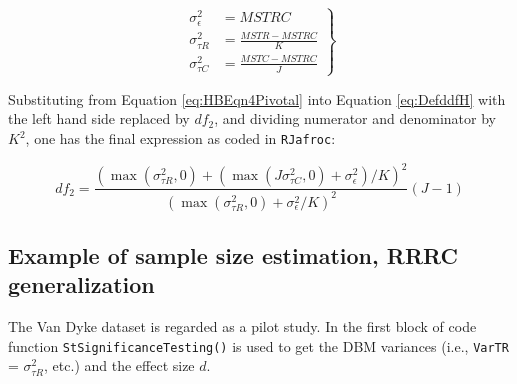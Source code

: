 \documentclass[
]{book}
\newenvironment{Shaded}{\begin{snugshade}}{\end{snugshade}}
\newcommand{\CommentTok}[1]{\textcolor[rgb]{0.56,0.35,0.01}{\textit{#1}}}
\newcommand{\DataTypeTok}[1]{\textcolor[rgb]{0.13,0.29,0.53}{#1}}
\newcommand{\KeywordTok}[1]{\textcolor[rgb]{0.13,0.29,0.53}{\textbf{#1}}}
\newcommand{\NormalTok}[1]{#1}
\newcommand{\OperatorTok}[1]{\textcolor[rgb]{0.81,0.36,0.00}{\textbf{#1}}}
\newcommand{\StringTok}[1]{\textcolor[rgb]{0.31,0.60,0.02}{#1}}
\begin{document}
\begin{equation}
\left.\begin{array}{rl}
\sigma_{\epsilon}^2&=MSTRC\\[1em]
\sigma_{\tau R}^2&=\displaystyle\frac{MSTR-MSTRC}{K}\\[1em]
\sigma_{\tau C}^2&=\displaystyle\frac{MSTC-MSTRC}{J}
\end{array}\right\}
\label{eq:HBEqn4Pivotal}
\end{equation}

Substituting from Equation \eqref{eq:HBEqn4Pivotal} into Equation \eqref{eq:DefddfH} with the left hand side replaced by \(df_2\), and dividing numerator and denominator by \(K^2\), one has the final expression as coded in \texttt{RJafroc}:

\begin{equation}
df_2 = \frac{(\max(\sigma_{\tau R}^2,0)+(\max(J\sigma_{\tau C}^2,0)+\sigma_{\epsilon}^2)/K)^2}{(\max(\sigma_{\tau R}^2,0)+\sigma_{\epsilon}^2/K)^2}(J-1)
\label{eq:ddfCoded}
\end{equation}

\hypertarget{example-of-sample-size-estimation-rrrc-generalization}{%
\subsection{Example of sample size estimation, RRRC generalization}\label{example-of-sample-size-estimation-rrrc-generalization}}

The Van Dyke dataset is regarded as a pilot study. In the first block of code function \texttt{StSignificanceTesting()} is used to get the DBM variances (i.e., \texttt{VarTR} = \(\sigma_{\tau R}^2\), etc.) and the effect size \(d\).

\begin{Shaded}
\end{Shaded}
\end{document}

